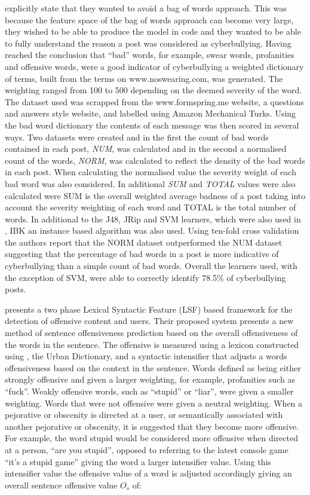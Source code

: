 \citet{reynolds_using_2011} explicitly state that they wanted to avoid a bag of words approach. This was because the feature space of the bag of words approach can become very large, they wished to be able to produce the model in code and they wanted to be able to fully understand the reason a post was considered as cyberbullying. Having reached the conclusion that ``bad'' words, for example, swear words, profanities and offensive words, were a good indicator of cyberbullying a weighted dictionary of terms, built from the terms on www.noswearing.com, was generated. The weighting ranged from 100 to 500 depending on the deemed severity of the word. The dataset used was scrapped from the www.formspring.me website, a questions and answers style website, and labelled using Amazon Mechanical Turks. Using the bad word dictionary the contents of each message was then scored in several ways. Two datasets were created and in the first the count of bad words contained in each post, \textit{NUM}, was calculated and in the second a normalised count of the words, \textit{NORM}, was calculated to reflect the density of the bad words in each post. When calculating the normalised value the severity weight of each bad word was also considered. In additional \textit{SUM} and \textit{TOTAL} values were also calculated were SUM is the overall weighted average badness of a post taking into account the severity weighting of each word and TOTAL is the total number of words. In additional to the J48, JRip and SVM learners, which were also used in \cite{dinakar_modeling_2011}, IBK an instance based algorithm was also used. Using ten-fold cross validation the authors report that the NORM dataset outperformed the NUM dataset suggesting that the percentage of bad words in a post is more indicative of cyberbullying than a simple count of bad words. Overall the learners used, with the exception of SVM, were able to correctly identify 78.5\% of cyberbullying posts.

\citet{chen_detecting_2012} presents a two phase Lexical Syntactic Feature (LSF) based framework for the detection of offensive content and users. Their proposed system presents a new method of sentence offensiveness prediction based on the overall offensiveness of the words in the sentence. The offensive is measured using a lexicon constructed using \citet{xu_filtering_2010}, the Urban Dictionary, and a syntactic intensifier that adjusts a words offensiveness based on the context in the sentence. Words defined as being either strongly offensive and given a larger weighting, for example, profanities such as ``fuck''. Weakly offensive words, such as ``stupid'' or ``liar'', were given a smaller weighting. Words that were not offensive were given a neutral weighting. When a pejorative or obscenity is directed at a user, or semantically associated with another pejorative or obscenity, it is suggested that they become more offensive. For example, the word stupid would be considered more offensive when directed at a person, ``are you stupid'', opposed to referring to the latest console game ``it's a stupid game'' giving the word a larger intensifier value. Using this intensifier value the offensive value of a word is adjusted accordingly giving an overall sentence offensive value ${O}_{{s}}$ of:

